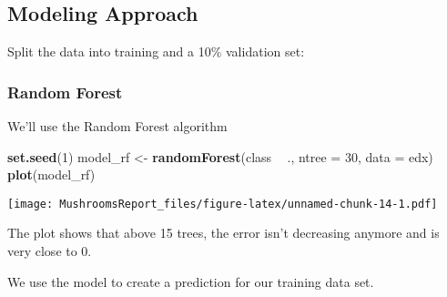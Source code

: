 \documentclass[]{article}
\newenvironment{Shaded}{\begin{snugshade}}{\end{snugshade}}
\newcommand{\KeywordTok}[1]{\textcolor[rgb]{0.13,0.29,0.53}{\textbf{#1}}}
\newcommand{\DataTypeTok}[1]{\textcolor[rgb]{0.13,0.29,0.53}{#1}}
\newcommand{\DecValTok}[1]{\textcolor[rgb]{0.00,0.00,0.81}{#1}}
\newcommand{\FloatTok}[1]{\textcolor[rgb]{0.00,0.00,0.81}{#1}}
\newcommand{\StringTok}[1]{\textcolor[rgb]{0.31,0.60,0.02}{#1}}
\newcommand{\CommentTok}[1]{\textcolor[rgb]{0.56,0.35,0.01}{\textit{#1}}}
\newcommand{\OtherTok}[1]{\textcolor[rgb]{0.56,0.35,0.01}{#1}}
\newcommand{\OperatorTok}[1]{\textcolor[rgb]{0.81,0.36,0.00}{\textbf{#1}}}
\newcommand{\NormalTok}[1]{#1}
\begin{document}
\subsection{Modeling Approach}\label{modeling-approach}

Split the data into training and a 10\% validation set:

\begin{Shaded}
\end{Shaded}

\subsubsection{Random Forest}\label{random-forest}

We'll use the Random Forest algorithm

\begin{Shaded}
\begin{Highlighting}[]
\KeywordTok{set.seed}\NormalTok{(}\DecValTok{1}\NormalTok{)}
\NormalTok{model_rf <-}\StringTok{ }\KeywordTok{randomForest}\NormalTok{(class }\OperatorTok{~}\StringTok{ }\NormalTok{., }\DataTypeTok{ntree =} \DecValTok{30}\NormalTok{, }\DataTypeTok{data =}\NormalTok{ edx)}
\KeywordTok{plot}\NormalTok{(model_rf)}
\end{Highlighting}
\end{Shaded}

\texttt{[image: MushroomsReport\_files/figure-latex/unnamed-chunk-14-1.pdf]}

The plot shows that above 15 trees, the error isn't decreasing anymore
and is very close to 0.

We use the model to create a prediction for our training data set.

\begin{Shaded}
\end{Shaded}
\end{document}
